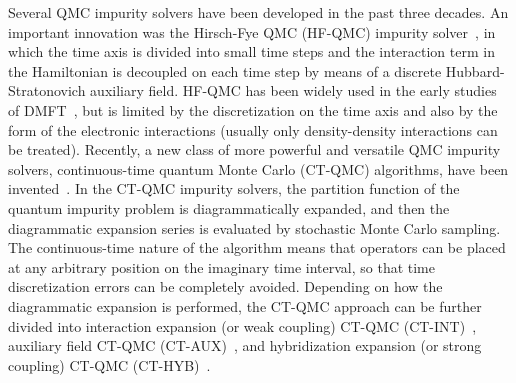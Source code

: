 Several QMC impurity solvers have been developed in the past three decades. An important innovation was the Hirsch-Fye QMC (HF-QMC) impurity solver~\cite{PhysRevLett.56.2521,PhysRevLett.69.168}, in which the time axis is divided into small time steps and the interaction term in the Hamiltonian is decoupled on each time step by means of a discrete Hubbard-Stratonovich auxiliary field. HF-QMC has been widely used in the early studies of DMFT~\cite{RevModPhys.68.13,RevModPhys.77.1027, RevModPhys.78.865}, but is limited by the discretization on the time axis and also by the form of the electronic interactions (usually only density-density interactions can be treated). Recently, a new class of more powerful and versatile QMC impurity solvers, continuous-time quantum Monte Carlo (CT-QMC) algorithms, have been invented~\cite{PhysRevB.72.035122,Gull2008,PhysRevB.74.155107,PhysRevB.75.155113,PhysRevLett.97.076405,RevModPhys.83.349}. In the CT-QMC impurity solvers, the partition function of the quantum impurity problem is diagrammatically expanded, and then the diagrammatic expansion series is evaluated by stochastic Monte Carlo sampling. The continuous-time nature of the algorithm means that operators can be placed at any arbitrary position on the imaginary time interval, so that time discretization errors can be completely avoided. Depending on how the diagrammatic expansion is performed, the CT-QMC approach can be further divided into interaction expansion (or weak coupling) CT-QMC (CT-INT)~\cite{PhysRevB.72.035122}, auxiliary field CT-QMC (CT-AUX)~\cite{Gull2008}, and hybridization expansion (or strong coupling) CT-QMC (CT-HYB)~\cite{PhysRevLett.97.076405,PhysRevB.74.155107,PhysRevB.75.155113}.


